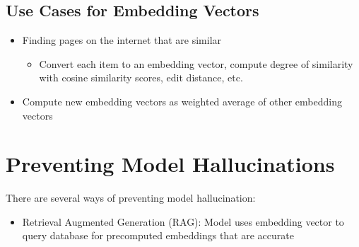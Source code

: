\documentclass{article}
\begin{document}
\subsection{Use Cases for Embedding Vectors}
\begin{itemize}
    \item Finding pages on the internet that are similar
        \begin{itemize}
            \item Convert each item to an embedding vector, compute degree of similarity with cosine similarity scores, edit distance, etc.
        \end{itemize}
    \item Compute new embedding vectors as weighted average of other embedding vectors
\end{itemize}

\section{Preventing Model Hallucinations}
There are several ways of preventing model hallucination:
\begin{itemize}
    \item Retrieval Augmented Generation (RAG): Model uses embedding vector to query database for precomputed embeddings that are accurate
\end{itemize}
\end{document}

